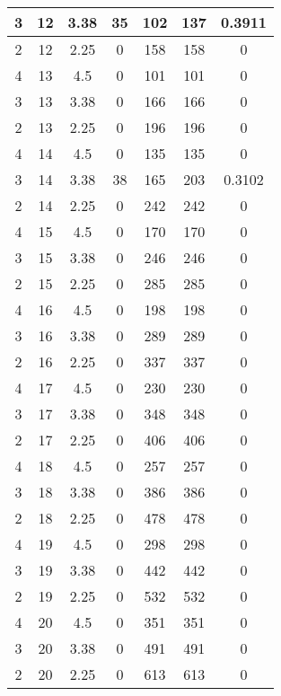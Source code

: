 \documentclass[letterpaper, 12pt]{article}
\begin{document}
\begin{longtable}{|c|c|c|c|c|c|c|}
\hline
3 & 12 & 3.38 & 35 & 102 & 137 & 0.3911 \\
\hline
2 & 12 & 2.25 & 0 & 158 & 158 & 0 \\
\hline
4 & 13 & 4.5 & 0 & 101 & 101 & 0 \\
\hline
3 & 13 & 3.38 & 0 & 166 & 166 & 0 \\
\hline
2 & 13 & 2.25 & 0 & 196 & 196 & 0 \\
\hline
4 & 14 & 4.5 & 0 & 135 & 135 & 0 \\
\hline
3 & 14 & 3.38 & 38 & 165 & 203 & 0.3102 \\
\hline
2 & 14 & 2.25 & 0 & 242 & 242 & 0 \\
\hline
4 & 15 & 4.5 & 0 & 170 & 170 & 0 \\
\hline
3 & 15 & 3.38 & 0 & 246 & 246 & 0 \\
\hline
2 & 15 & 2.25 & 0 & 285 & 285 & 0 \\
\hline
4 & 16 & 4.5 & 0 & 198 & 198 & 0 \\
\hline
3 & 16 & 3.38 & 0 & 289 & 289 & 0 \\
\hline
2 & 16 & 2.25 & 0 & 337 & 337 & 0 \\
\hline
4 & 17 & 4.5 & 0 & 230 & 230 & 0 \\
\hline
3 & 17 & 3.38 & 0 & 348 & 348 & 0 \\
\hline
2 & 17 & 2.25 & 0 & 406 & 406 & 0 \\
\hline
4 & 18 & 4.5 & 0 & 257 & 257 & 0 \\
\hline
3 & 18 & 3.38 & 0 & 386 & 386 & 0 \\
\hline
2 & 18 & 2.25 & 0 & 478 & 478 & 0 \\
\hline
4 & 19 & 4.5 & 0 & 298 & 298 & 0 \\
\hline
3 & 19 & 3.38 & 0 & 442 & 442 & 0 \\
\hline
2 & 19 & 2.25 & 0 & 532 & 532 & 0 \\
\hline
4 & 20 & 4.5 & 0 & 351 & 351 & 0 \\
\hline
3 & 20 & 3.38 & 0 & 491 & 491 & 0 \\
\hline
2 & 20 & 2.25 & 0 & 613 & 613 & 0 \\
\hline
\end{longtable}
\end{document}
